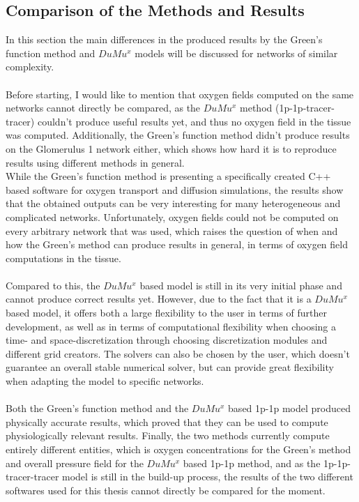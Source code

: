 \subsection{Comparison of the Methods and Results}
In this section the main differences in the produced results by the Green's function method and $DuMu^x$ models will be discussed for networks of similar complexity.\\
\\Before starting, I would like to mention that oxygen fields computed on the same networks cannot directly be compared, as the $DuMu^x$ method (1p-1p-tracer-tracer) couldn't produce useful results yet, and thus no oxygen field in the tissue was computed. Additionally, the Green's function method didn't produce results on the Glomerulus 1 network either, which shows how hard it is to reproduce results using different methods in general.\\
While the Green's function method is presenting a specifically created C++ based software for oxygen transport and diffusion simulations, the results show that the obtained outputs can be very interesting for many heterogeneous and complicated networks. Unfortunately, oxygen fields could not be computed on every arbitrary network that was used, which raises the question of when and how the Green's method can produce results in general, in terms of oxygen field computations in the tissue.\\
\\Compared to this, the $DuMu^x$ based model is still in its very initial phase and cannot produce correct results yet. However, due to the fact that it is a $DuMu^x$ based model, it offers both a large flexibility to the user in terms of further development, as well as in terms of computational flexibility when choosing a time- and space-discretization through choosing discretization modules and different grid creators. The solvers can also be chosen by the user, which doesn't guarantee an overall stable numerical solver, but can provide great flexibility when adapting the model to specific networks.\\
\\Both the Green's function method and the $DuMu^x$ based 1p-1p model produced physically accurate results, which proved that they can be used to compute physiologically relevant results. Finally, the two methods currently compute entirely different entities, which is oxygen concentrations for the Green's method and overall pressure field for the $DuMu^x$ based 1p-1p method, and as the 1p-1p-tracer-tracer model is still in the build-up process, the results of the two different softwares used for this thesis cannot directly be compared for the moment.


